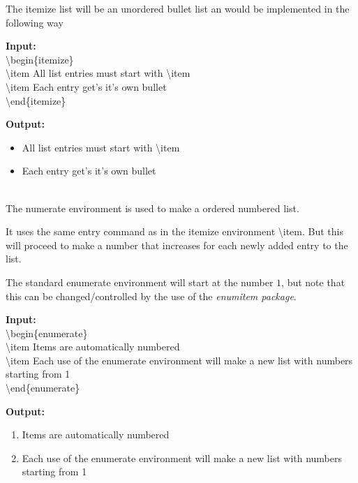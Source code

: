 \documentclass{article}
\newcommand{\jbs}[1]{\textbackslash{}#1} %
\begin{document}
The itemize list will be an unordered bullet list an would be implemented in the 
following way
\begin{multicols}{2}
    \begin{minipage}{\linewidth}
        \textbf{Input:} \\
        \jbs{begin\{itemize\}} \\
        \jbs{item} All list entries must start with \jbs{item} \\
        \jbs{item} Each entry get's it's own bullet \\
        \jbs{end\{itemize\}}
    \end{minipage}
    
    \begin{minipage}{\linewidth}
        \textbf{Output: } \\
        \begin{itemize}
            \item All list entries must start with \jbs{item}
            \item Each entry get's it's own bullet
        \end{itemize}
    \end{minipage}
\end{multicols}

 \\
\indent The numerate environment is used to make a ordered numbered list.

It uses the same entry command as in the itemize environment \jbs{item}. But 
this will proceed to make a number that increases for each newly added entry
to the list.

The standard enumerate environment will start at the number $1$, but note that 
this can be changed/controlled by the use of the \textit{enumitem package}.

\begin{multicols}{2}
    \begin{minipage}{\linewidth}
        \textbf{Input:} \\
        \jbs{begin\{enumerate\}} \\
        \jbs{item} Items are automatically numbered \\
        \jbs{item} Each use of the enumerate environment will make a new list 
                    with numbers starting from 1 \\
        \jbs{end\{enumerate\}}
    \end{minipage}

    \begin{minipage}{\linewidth}
        \textbf{Output:} \\
        \begin{enumerate}
            \item Items are automatically numbered
            \item Each use of the enumerate environment will make a new list  
                    with numbers starting from 1
        \end{enumerate}
    \end{minipage}
\end{multicols}
\end{document}
